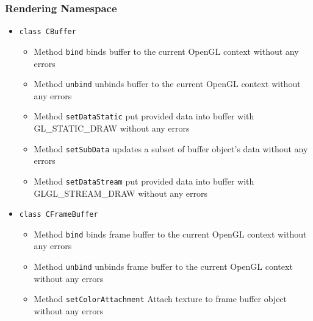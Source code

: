 \documentclass{report}
\begin{document}
\subsubsection{Rendering Namespace}
\begin{itemize}
%
%	
\item \texttt{class CBuffer}
		\begin{itemize}
			\item Method \texttt{bind} binds buffer to the current OpenGL context without any errors
			\item Method \texttt{unbind} unbinds buffer to the current OpenGL context without any errors
			\item Method \texttt{setDataStatic} put provided data into buffer with GL\_STATIC\_DRAW without any errors
			\item Method \texttt{setSubData} updates a subset of buffer object's data without any errors
			\item Method \texttt{setDataStream} put provided data into buffer with GLGL\_STREAM\_DRAW without any errors
		\end{itemize}

%
%	
\item \texttt{class CFrameBuffer}
		\begin{itemize}
			\item Method \texttt{bind} binds frame buffer to the current OpenGL context without any errors
			\item Method \texttt{unbind} unbinds frame buffer to the current OpenGL context without any errors
			\item Method \texttt{setColorAttachment} Attach texture to frame buffer object without any errors
		\end{itemize}
		


\end{itemize}
\end{document}

